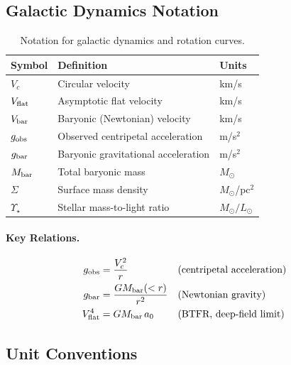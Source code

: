 \subsection{Galactic Dynamics Notation}\label{app:galactic_notation}

\begin{table}[h!]
\centering
\caption{Notation for galactic dynamics and rotation curves.}
\label{tab:galactic}
\begin{tabular}{lll}
\toprule
\textbf{Symbol} & \textbf{Definition} & \textbf{Units} \\
\midrule
$V_c$ & Circular velocity & km/s \\
$V_{\rm flat}$ & Asymptotic flat velocity & km/s \\
$V_{\rm bar}$ & Baryonic (Newtonian) velocity & km/s \\
$g_{\rm obs}$ & Observed centripetal acceleration & m/s$^2$ \\
$g_{\rm bar}$ & Baryonic gravitational acceleration & m/s$^2$ \\
$M_{\rm bar}$ & Total baryonic mass & $M_\odot$ \\
$\Sigma$ & Surface mass density & $M_\odot$/pc$^2$ \\
$\Upsilon_\star$ & Stellar mass-to-light ratio & $M_\odot/L_\odot$ \\
\bottomrule
\end{tabular}
\end{table}

\paragraph{Key Relations.}
\begin{align}
g_{\rm obs} &= \frac{V_c^2}{r} && \text{(centripetal acceleration)} \\
g_{\rm bar} &= \frac{GM_{\rm bar}(<r)}{r^2} && \text{(Newtonian gravity)} \\
V_{\rm flat}^4 &= GM_{\rm bar}\,a_0 && \text{(BTFR, deep-field limit)}
\end{align}

\subsection{Unit Conventions}\label{app:units}

